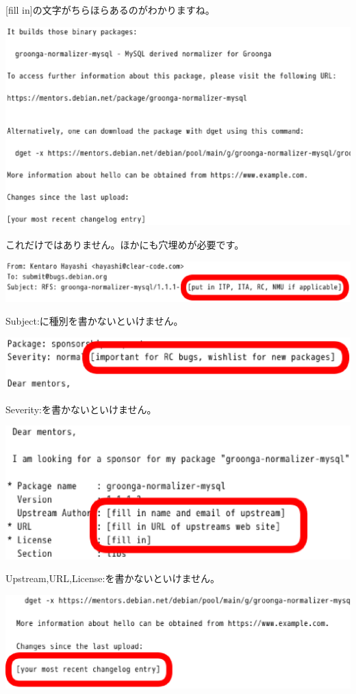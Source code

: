 \documentclass[mingoth,a4paper]{jsarticle}
\begin{document}
[fill in]の文字がちらほらあるのがわかりますね。

\begin{screen}
\includegraphics[width=0.5\hsize]{image201606/rfs-template-pithole2.eps}
\end{screen}

これだけではありません。ほかにも穴埋めが必要です。

\begin{screen}
\includegraphics[width=0.5\hsize]{image201606/rfs-template-fill-in1.eps}
\end{screen}

Subject:に種別を書かないといけません。

\begin{screen}
\includegraphics[width=0.5\hsize]{image201606/rfs-template-fill-in2.eps}
\end{screen}

Severity:を書かないといけません。

\begin{screen}
\includegraphics[width=0.5\hsize]{image201606/rfs-template-fill-in3.eps}
\end{screen}

Upstream,URL,License:を書かないといけません。

\begin{screen}
\includegraphics[width=0.5\hsize]{image201606/rfs-template-fill-in4.eps}
\end{screen}
\end{document}
